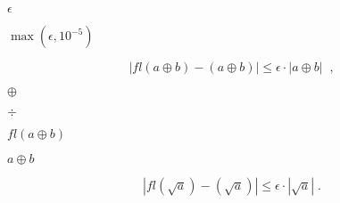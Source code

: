 \providecommand{\calS}{{\cal S}}%


\providecommand{\hatcalS}{{\hat{\cal S}}}%


\providecommand{\shat}{\hat{s}}%


\providecommand{\Shat}{\hat{S}}%


\providecommand{\xhat}{\hat{x}}%


\providecommand{\alg}{{\rm alg}}%


\providecommand{\nrminf}[1]{ \| #1 \|_\infty }%


\providecommand{\nrmtwo}[1]{ \| #1 \|_2 }%


\providecommand{\nrmfro}[1]{ \| #1 \|_F }%


\providecommand{\nrmone}[1]{ \| #1 \|_1 }%


\providecommand{\norma}[1]{ \| #1 \| }%


\providecommand{\ds}{\displaystyle}%


\providecommand{\ba}{bar}%


\providecommand{\ti}{tilde}%


\providecommand{\ha}{\widehat}%

{\newpage\clearpage
{}%
$\epsilon$%
\lthtmlinlinemathZ
\lthtmlcheckvsize\clearpage}

{\newpage\clearpage
{}%
$\max(\epsilon, 10^{-5})$%
\lthtmlinlinemathZ
\lthtmlcheckvsize\clearpage}

{\newpage\clearpage
{}%
\begin{displaymath}
| fl(a \oplus b ) - (a \oplus b ) | \leq \epsilon \cdot | a \oplus b | \; \; ,
\end{displaymath}%
\lthtmldisplayZ
\lthtmlcheckvsize\clearpage}

{\newpage\clearpage
{}%
$\oplus$%
\lthtmlinlinemathZ
\lthtmlcheckvsize\clearpage}

{\newpage\clearpage
{}%
$\div$%
\lthtmlinlinemathZ
\lthtmlcheckvsize\clearpage}

{\newpage\clearpage
{}%
$fl(a \oplus b)$%
\lthtmlinlinemathZ
\lthtmlcheckvsize\clearpage}

{\newpage\clearpage
{}%
$a \oplus b$%
\lthtmlinlinemathZ
\lthtmlcheckvsize\clearpage}

{\newpage\clearpage
{}%
\begin{displaymath}
| fl( \sqrt{a} ) - (\sqrt{a} ) | \leq \epsilon \cdot | \sqrt{a} | \; .
\end{displaymath}%
\lthtmldisplayZ
\lthtmlcheckvsize\clearpage}

